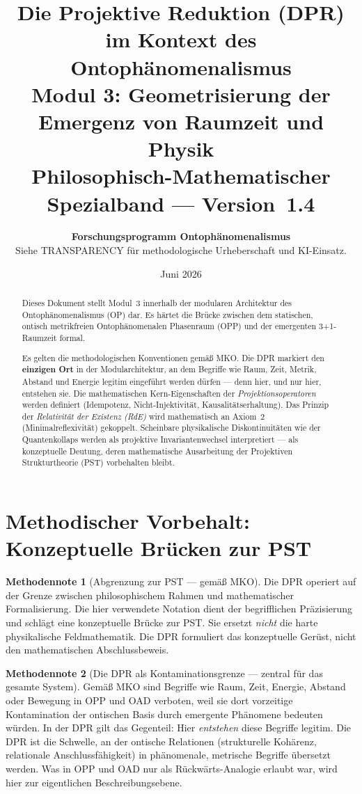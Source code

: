 \documentclass[11pt,a4paper]{article}
\title{
  \textbf{Die Projektive Reduktion (DPR)}\\
  \textbf{im Kontext des Ontoph\"{a}nomenalismus}\\[0.4em]
  {\large Modul 3: Geometrisierung der Emergenz von Raumzeit und Physik}\\[0.5em]
  {\normalsize Philosophisch-Mathematischer Spezialband --- Version~1.4}
}
\author{
  \textbf{Forschungsprogramm Ontoph\"{a}nomenalismus}\\
  \small Siehe TRANSPARENCY f\"{u}r methodologische Urheberschaft und KI-Einsatz.
}
\date{Juni 2026}
\theoremstyle{plain}
\theoremstyle{definition}
\newtheorem{methodennote}{Methodennote}[section]
\begin{document}
\maketitle

\begin{abstract}
Dieses Dokument stellt Modul~3 innerhalb der modularen Architektur des
Ontoph\"{a}nomenalismus (OP) dar. Es h\"{a}rtet die Br\"{u}cke zwischen dem statischen,
ontisch metrikfreien Ontoph\"{a}nomenalen Phasenraum (OPP) und der emergenten
3+1-Raumzeit formal.

Es gelten die methodologischen Konventionen gem\"{a}\ss{} MKO. Die DPR markiert den
\textbf{einzigen Ort} in der Modularchitektur, an dem Begriffe wie Raum, Zeit, Metrik,
Abstand und Energie legitim eingef\"{u}hrt werden d\"{u}rfen --- denn hier, und nur hier,
entstehen sie. Die mathematischen Kern-Eigenschaften der \emph{Projektionsoperatoren}
werden definiert (Idempotenz, Nicht-Injektivit\"{a}t, Kausalit\"{a}tserhaltung). Das
Prinzip der \emph{Relativit\"{a}t der Existenz (RdE)} wird mathematisch an Axiom~2
(Minimalreflexivit\"{a}t) gekoppelt. Scheinbare physikalische Diskontinuit\"{a}ten wie
der Quantenkollaps werden als projektive Invariantenwechsel interpretiert --- als
konzeptuelle Deutung, deren mathematische Ausarbeitung der Projektiven Strukturtheorie
(PST) vorbehalten bleibt.
\end{abstract}

\tableofcontents
\newpage

\section{Methodischer Vorbehalt: Konzeptuelle Br\"{u}cken zur PST}

\begin{methodennote}[Abgrenzung zur PST --- gem\"{a}\ss{} MKO]
Die DPR operiert auf der Grenze zwischen philosophischem Rahmen und mathematischer
Formalisierung. Die hier verwendete Notation dient der begrifflichen Pr\"{a}zisierung
und schl\"{a}gt eine konzeptuelle Br\"{u}cke zur PST. Sie ersetzt \emph{nicht} die harte
physikalische Feldmathematik. Die DPR formuliert das konzeptuelle Ger\"{u}st, nicht den
mathematischen Abschlussbeweis.
\end{methodennote}

\begin{methodennote}[Die DPR als Kontaminationsgrenze --- zentral f\"{u}r das gesamte
System]
Gem\"{a}\ss{} MKO sind Begriffe wie Raum, Zeit, Energie, Abstand oder Bewegung in OPP
und OAD verboten, weil sie dort vorzeitige Kontamination der ontischen Basis durch
emergente Ph\"{a}nomene bedeuten w\"{u}rden. In der DPR gilt das Gegenteil: Hier
\emph{entstehen} diese Begriffe legitim. Die DPR ist die Schwelle, an der ontische
Relationen (strukturelle Koh\"{a}renz, relationale Anschlussf\"{a}higkeit) in
ph\"{a}nomenale, metrische Begriffe \"{u}bersetzt werden. Was in OPP und OAD nur als
R\"{u}ckw\"{a}rts-Analogie erlaubt war, wird hier zur eigentlichen Beschreibungsebene.
\end{methodennote}
\end{document}
